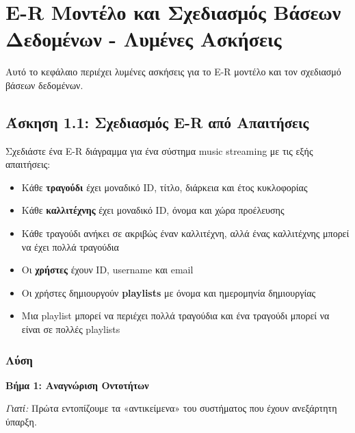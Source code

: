 
\chapter{E-R Μοντέλο και Σχεδιασμός Βάσεων Δεδομένων - Λυμένες Ασκήσεις}
\label{ch:er-model-exercises}

Αυτό το κεφάλαιο περιέχει λυμένες ασκήσεις για το E-R μοντέλο και τον σχεδιασμό
βάσεων δεδομένων.

\section{Άσκηση 1.1: Σχεδιασμός E-R από Απαιτήσεις}

\begin{formulabox}[Εκφώνηση]
Σχεδιάστε ένα E-R διάγραμμα για ένα σύστημα music streaming με τις εξής απαιτήσεις:
\begin{itemize}
    \item Κάθε \textbf{τραγούδι} έχει μοναδικό ID, τίτλο, διάρκεια και έτος κυκλοφορίας
    \item Κάθε \textbf{καλλιτέχνης} έχει μοναδικό ID, όνομα και χώρα προέλευσης
    \item Κάθε τραγούδι ανήκει σε ακριβώς έναν καλλιτέχνη, αλλά ένας καλλιτέχνης μπορεί να έχει πολλά τραγούδια
    \item Οι \textbf{χρήστες} έχουν ID, username και email
    \item Οι χρήστες δημιουργούν \textbf{playlists} με όνομα και ημερομηνία δημιουργίας
    \item Μια playlist μπορεί να περιέχει πολλά τραγούδια και ένα τραγούδι μπορεί να είναι σε πολλές playlists
\end{itemize}
\end{formulabox}

\subsection*{Λύση}

\textbf{Βήμα 1: Αναγνώριση Οντοτήτων}

\textit{Γιατί:} Πρώτα εντοπίζουμε τα «αντικείμενα» του συστήματος που έχουν ανεξάρτητη ύπαρξη.

